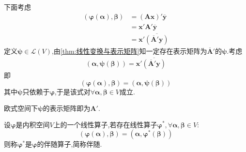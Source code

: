         下面考虑\begin{align*}
            \left(
                \bm{\varphi}\left(\bm{\alpha}\right),\bm{\beta}
            \right)&=\left(\bm{Ax}\right)'\overline{\bm{y}}\\
            &=\bm{x}'\bm{A}'\overline{\bm{y}}\\
            &=\bm{x}'\overline{\left(
                \overline{\bm{A}}'\bm{y}
            \right)}
        \end{align*}
        定义$\bm{\psi}\in\mathcal{L}\left(V\right)$,由\cref{thm:线性变换与表示矩阵}知一定存在表示矩阵为$\overline{\bm{A}}'$的$\bm{\psi}$.考虑\begin{align*}
            \left(
                \bm{\alpha},\bm{\psi}\left(\bm{\beta}\right)
            \right)=\bm{x}'\overline{\left(
                \overline{\bm{A}}'\bm{y}
            \right)}
        \end{align*}即\[
        \left(
            \bm{\varphi}\left(\bm{\alpha}\right),\bm{\beta}
        \right)=\left(
            \bm{\alpha},\bm{\psi}\left(\bm{\beta}\right)
        \right)
        \]其中$\bm{\psi}$只依赖于$\bm{\varphi}$,于是该式对$\forall\bm{\alpha},\bm{\beta}\in V$成立.
        \begin{red}
            \begin{remark}
                欧式空间下$\bm{\psi}$的表示矩阵即为$\bm{A}'.$
            \end{remark}
        \end{red}
        \begin{formal}
            \begin{definition}[伴随算子的定义]\label{def:伴随算子的定义}
                设$\bm{\varphi}$是内积空间$V$上的一个线性算子,若存在线性算子$\bm{\varphi}^*,\forall\bm{\alpha},\bm{\beta}\in V:$\[
                \left(
                    \bm{\varphi}\left(\bm{\alpha}\right),\bm{\beta}
                \right)=\left(
                    \bm{\alpha},\bm{\varphi}^*\left(\bm{\beta}\right)
                \right)
                \]则称$\bm{\varphi}^*$是$\bm{\varphi}$的伴随算子,简称伴随.
            \end{definition}
        \end{formal}
